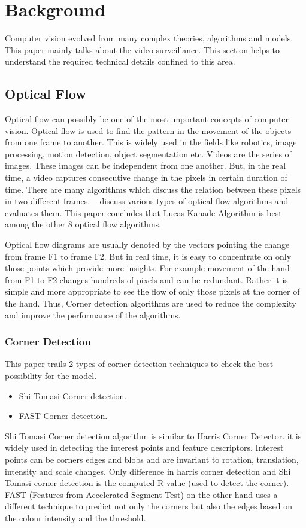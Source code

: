 \chapter{Background}
Computer vision evolved from many complex theories, algorithms and models. This paper mainly talks 
about the video surveillance. This section helps to understand the required technical details confined to this area. 
\section{Optical Flow}
Optical flow can possibly be one of the most important concepts of computer vision. Optical flow is used 
to find the pattern in the movement of the objects from one frame to another. This is widely used in the 
fields like robotics, image processing, motion detection, object segmentation etc. Videos are the series of 
images. These images can be independent from one another. But, in the real time, a video captures 
consecutive change in the pixels in certain duration of time. There are many algorithms which discuss 
the relation between these pixels in two different frames. ~\cite{galvin1998recovering} discuss various 
types of optical flow algorithms and evaluates them. This paper concludes that Lucas Kanade Algorithm 
is best among the other 8 optical flow algorithms.

Optical flow diagrams are usually denoted by the vectors pointing the change from frame F1 to frame F2. But in real time, it is easy to concentrate on only those points which provide more insights. For example movement of the hand from F1 to F2 changes hundreds of pixels and can be redundant. Rather it is simple and more appropriate to see the flow of only those pixels at the corner of the hand. Thus, Corner detection algorithms are used to reduce the complexity and improve the performance of the algorithms.
\subsection{Corner Detection}
This paper trails 2 types of corner detection techniques to check the best possibility for the model.
\begin{itemize}
	\item Shi-Tomasi Corner detection.
	\item FAST Corner detection.
\end{itemize}
Shi Tomasi Corner detection algorithm is similar to Harris Corner Detector. it is widely used in detecting the interest points and feature descriptors. Interest points can be corners edges and blobs and are invariant to rotation, translation, intensity and scale changes. Only difference in harris corner detection and Shi Tomasi corner detection is the computed R value (used to detect the corner). 
FAST (Features from Accelerated Segment Test) on the other hand uses a different technique to predict not only the corners but also the edges based on the colour intensity and the threshold. 
